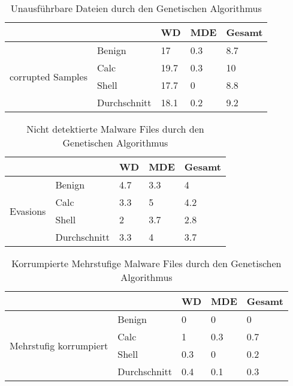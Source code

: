 \begin{table}[]
\begin{tabular}{@{}lllll@{}}
\toprule
                                   &              & WD   & MDE & Gesamt \\ \midrule
\multirow{4}{*}{corrupted Samples} & Benign       & 17   & 0.3 & 8.7    \\
                                   & Calc         & 19.7 & 0.3 & 10     \\
                                   & Shell        & 17.7 & 0   & 8.8    \\
                                   & Durchschnitt & 18.1 & 0.2 & 9.2    \\ \cmidrule(l){2-5} 
\end{tabular}
\caption{Unausführbare Dateien durch den Genetischen Algorithmus}
\label{tab:corrupted_files}
\end{table}

\begin{table}[]
\begin{tabular}{@{}lllll@{}}
\toprule
                          &              & WD  & MDE & Gesamt \\ \midrule
\multirow{4}{*}{Evasions} & Benign       & 4.7 & 3.3 & 4      \\
                          & Calc         & 3.3 & 5   & 4.2    \\
                          & Shell        & 2   & 3.7 & 2.8    \\
                          & Durchschnitt & 3.3 & 4   & 3.7    \\ \cmidrule(l){2-5} 
\end{tabular}
\caption{Nicht detektierte Malware Files durch den Genetischen Algorithmus}
\label{tab:evasions}
\end{table}

\begin{table}[]
\begin{tabular}{@{}lllll@{}}
\toprule
                                        &              & WD  & MDE & Gesamt \\ \midrule
\multirow{4}{*}{Mehrstufig korrumpiert} & Benign       & 0   & 0   & 0      \\
                                        & Calc         & 1   & 0.3 & 0.7    \\
                                        & Shell        & 0.3 & 0   & 0.2    \\
                                        & Durchschnitt & 0.4 & 0.1 & 0.3    \\ \cmidrule(l){2-5} 
\end{tabular}
\caption{Korrumpierte Mehrstufige Malware Files durch den Genetischen Algorithmus}
\label{tab:multicorruption}
\end{table}
